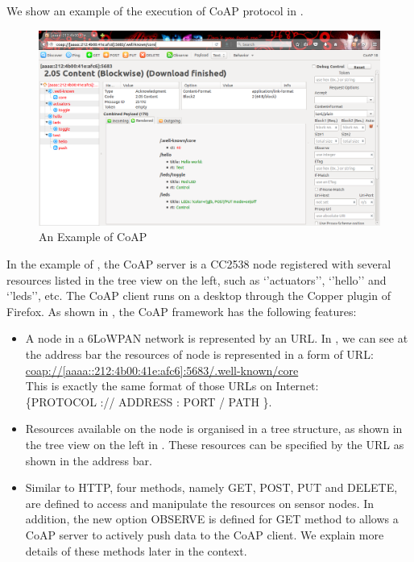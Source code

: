 We show an example of the execution of CoAP protocol in .
\begin{figure}[th!]
	\center
	\includegraphics[width=1\textwidth]{fig/CoapExample.png}
	\caption{An Example of CoAP}
	\label{Fig: An Example of CoAP}
\end{figure}

In the example of , the CoAP server is a CC2538 node registered with several resources listed in the tree view on the left, such as ‘’actuators’’, ‘’hello’’ and ‘’leds’’, etc. The CoAP client runs on a desktop through the Copper plugin\cite{Copper} of Firefox. As shown in , the CoAP framework has the following features:
\begin{itemize}
	\item A node in a 6LoWPAN network is represented by an URL. In , we can see at the address bar the resources of node is represented in a form of URL:\\
	\url{coap://[aaaa::212:4b00:41e:afc6]:5683/.well-known/core} \\
	This is exactly the same format of those URLs on Internet\cite{rfc3986}: \\
	 \{PROTOCOL :// ADDRESS : PORT / PATH \}.
	 \item Resources available on the node is organised in a tree structure, as shown in the tree view on the left in . These resources can be specified by the URL as shown in the address bar.
	 \item Similar to HTTP, four methods, namely GET, POST, PUT and DELETE, are defined to access and manipulate the resources on sensor nodes. In addition, the new option OBSERVE is defined for GET method to allows a CoAP server to actively push data to the CoAP client. We explain more details of these methods later in the context.
\end{itemize}

